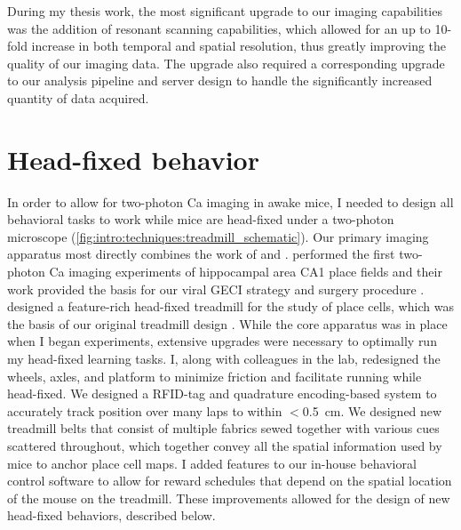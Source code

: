 During my thesis work, the most significant upgrade to our imaging capabilities was the addition of resonant scanning capabilities, which allowed for an up to 10-fold increase in both temporal and spatial resolution, thus greatly improving the quality of our imaging data.
The upgrade also required a corresponding upgrade to our analysis pipeline and server design to handle the significantly increased quantity of data acquired.

\section{Head-fixed behavior}
\label{sec:intro:techniques:behavior}
In order to allow for two-photon Ca imaging in awake mice, I needed to design all behavioral tasks to work while mice are head-fixed under a two-photon microscope (\autoref{fig:intro:techniques:treadmill_schematic}).
Our primary imaging apparatus most directly combines the work of \citeauthor{Dombeck2010} and \citeauthor{Royer2012}.
\citeauthor{Dombeck2010} performed the first two-photon Ca imaging experiments of hippocampal area CA1 place fields and their work provided the basis for our viral GECI strategy and surgery procedure \citep{Dombeck2010}.
\citeauthor{Royer2012} designed a feature-rich head-fixed treadmill for the study of place cells, which was the basis of our original treadmill design \citep{Royer2012}.
While the core apparatus was in place when I began experiments, extensive upgrades were necessary to optimally run my head-fixed learning tasks.
I, along with colleagues in the lab, redesigned the wheels, axles, and platform to minimize friction and facilitate running while head-fixed.
We designed a RFID-tag and quadrature encoding-based system to accurately track position over many laps to within $<$0.5~cm.
We designed new treadmill belts that consist of multiple fabrics sewed together with various cues scattered throughout, which together convey all the spatial information used by mice to anchor place cell maps.
I added features to our in-house behavioral control software to allow for reward schedules that depend on the spatial location of the mouse on the treadmill.
These improvements allowed for the design of new head-fixed behaviors, described below.

